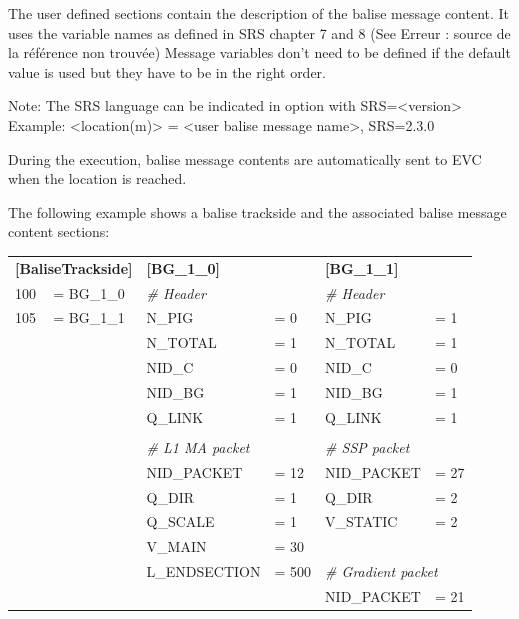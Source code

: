 	The user defined sections contain the description of the balise message content. It uses the variable names as defined in SRS chapter 7 and 8 (See Erreur : source de la référence non trouvée) Message variables don’t need to be defined if the default value is used but they have to be in the right order.

	Note: The SRS language can be indicated in option with SRS=<version> Example: <location(m)> = <user balise message name>, SRS=2.3.0

	During the execution, balise message contents are automatically sent to EVC when the location is reached.

	The following example shows a balise trackside and the associated balise message content sections:

	\begin{tabular}{|l l l l l l|}

		\hline

		\multicolumn{2}{|l}{ \begin{minipage}[t]{0.31\linewidth} \textbf{[BaliseTrackside]} \end{minipage} } & \multicolumn{2}{l}{ \begin{minipage}[t]{0.31\linewidth} \textbf{[BG\_1\_0]} \end{minipage} } & \multicolumn{2}{l|}{ \begin{minipage}[t]{0.31\linewidth} \textbf{[BG\_1\_1]} \end{minipage} } \\
		100  &= BG\_1\_0 & \multicolumn{2}{l}{\emph{\# Header}} & \multicolumn{2}{l|}{\emph{\# Header}} \\
		105  &= BG\_1\_1 & N\_PIG &= 0 & N\_PIG &= 1 \\
		& & N\_TOTAL &= 1 & N\_TOTAL &= 1 \\
		& & NID\_C &= 0 & NID\_C &= 0 \\
		& & NID\_BG &= 1 & NID\_BG &= 1 \\
		& & Q\_LINK &= 1 & Q\_LINK &= 1 \\
		& & & & & \\
		& & \multicolumn{2}{l}{\emph{\# L1 MA packet}} & \multicolumn{2}{l|}{\emph{\# SSP packet}} \\
		& & NID\_PACKET &= 12 & NID\_PACKET &= 27 \\
		& & Q\_DIR &= 1 & Q\_DIR &= 2 \\
		& & Q\_SCALE &= 1 & V\_STATIC &= 2 \\
		& & V\_MAIN &= 30 & & \\
		& & L\_ENDSECTION &= 500 & \multicolumn{2}{l|}{\emph{\# Gradient packet}} \\
		& & & & NID\_PACKET &= 21 \\

		\hline

	\end{tabular}

